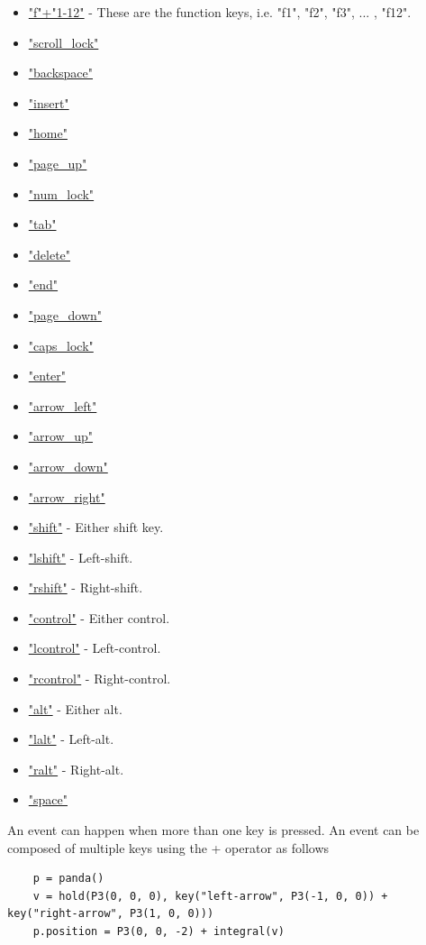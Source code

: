 \documentclass[10pt]{article}
\begin{document}
\begin{itemize}
    \item \underline{"f"+"1-12"} - These are the function keys, i.e. "f1", "f2", "f3", ... , "f12".
    \item \underline{"scroll\_lock"}
    \item \underline{"backspace"}
    \item \underline{"insert"}
    \item \underline{"home"}
    \item \underline{"page\_up"}
    \item \underline{"num\_lock"}
    \item \underline{"tab"}
    \item \underline{"delete"}
    \item \underline{"end"}
    \item \underline{"page\_down"}
    \item \underline{"caps\_lock"}
    \item \underline{"enter"}
    \item \underline{"arrow\_left"}
    \item \underline{"arrow\_up"}
    \item \underline{"arrow\_down"}
    \item \underline{"arrow\_right"}
    \item \underline{"shift"} - Either shift key.
    \item \underline{"lshift"} - Left-shift.
    \item \underline{"rshift"} - Right-shift.
    \item \underline{"control"} - Either control.
    \item \underline{"lcontrol"} - Left-control.
    \item \underline{"rcontrol"} - Right-control.
    \item \underline{"alt"} - Either alt.
    \item \underline{"lalt"} - Left-alt.
    \item \underline{"ralt"} - Right-alt.
    \item \underline{"space"}
\end{itemize}
An event can happen when more than one key is pressed.
An event can be composed of multiple keys using the + operator as follows
\begin{lstlisting}
    p = panda()
    v = hold(P3(0, 0, 0), key("left-arrow", P3(-1, 0, 0)) + key("right-arrow", P3(1, 0, 0)))
    p.position = P3(0, 0, -2) + integral(v)
\end{lstlisting}
    
\end{document}
